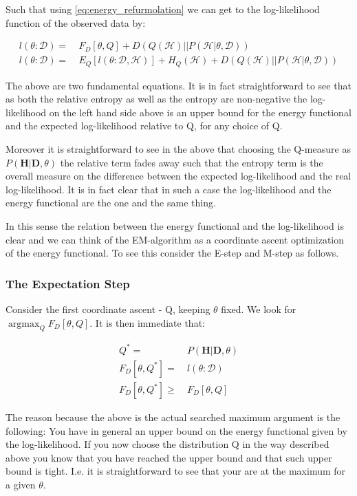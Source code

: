 \documentclass[11pt]{article}
\begin{document}
\begin{article}
Such that using \ref{eq:energy_refurmolation} we can get to the
log-likelihood function of the observed data by:

\begin{align} \label{eq:likelihood_energy_functional_relation}
l (\theta: \mathcal{D}) =& \  F_D[\theta, Q] + D (Q (\mathcal{H}) || P (\mathcal{H}| \theta, \mathcal{D})) \\
l (\theta: \mathcal{D}) =& \  E_Q[l (\theta: \mathcal{D}, \mathcal{H})]+ H_Q (\mathcal {H}) + D (Q (\mathcal{H}) || P (\mathcal{H}| \theta, \mathcal{D}))
\end{align}

The above are two fundamental equations. It is in fact
straightforward to see that as both the relative entropy as well as
the entropy are non-negative the log-likelihood on the left hand
side above is an upper bound for the energy functional and the expected
log-likelihood relative to Q, for any choice of Q.

Moreover it is straightforward to see in the above that choosing the
Q-measure as \(P (\textbf{H}| \textbf{D}, \theta)\) the relative term
fades away such that the entropy term is the overall measure on the
difference between the expected log-likelihood and the real
log-likelihood. It is in fact clear that in such a case the
log-likelihood and the energy functional are the one and the same
thing.

In this sense the relation between the energy functional and the
log-likelihood is clear and we can think of the EM-algorithm as a
coordinate ascent optimization of the energy functional. To see this
consider the E-step and M-step as follows.

\subsubsection{The Expectation Step}
\label{sec:orgd1e397e}

Consider the first coordinate ascent - Q, keeping \(\theta\)
fixed. We look for \(\operatorname*{argmax}_{Q} F_D[\theta, Q]\). It
is then immediate that:

\begin{align} \label{eq:q_optimum}
Q^* =& \ P (\textbf{H}|\textbf{D}, \theta) \\
F_D[\theta, Q^*] =& \ l (\theta: \mathcal{D}) \\
F_D[\theta, Q^*] \geq& \ F_D[\theta, Q]
\end{align}

The reason because the above is the actual searched maximum
argument is the following: You have in general an upper bound on
the energy functional given by the log-likelihood. If you now choose
the distribution Q in the way described above you know that you
have reached the upper bound and that such upper bound is
tight. I.e. it is straightforward to see that your are at the
maximum for a given \(\theta\).


\end{article}
\end{document}
